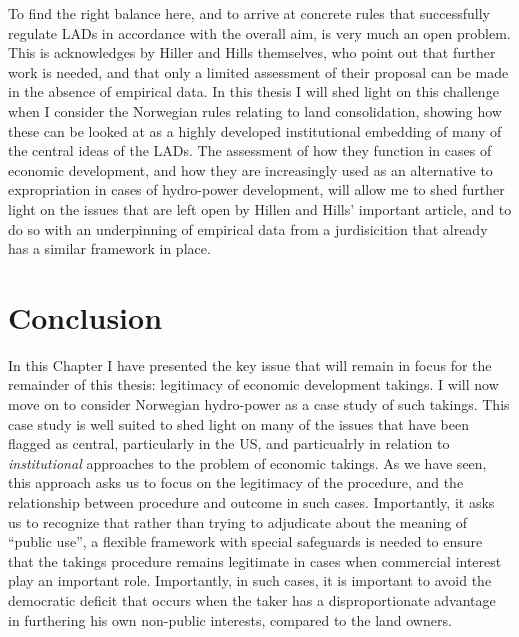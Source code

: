 To find the right balance here, and to arrive at concrete rules that successfully regulate LADs in accordance with the overall aim, is very much an open problem. This is acknowledges by Hiller and Hills themselves, who point out that further work is needed, and that only a limited assessment of their proposal can be made in the absence of empirical data. In this thesis I will shed light on this challenge when I consider the Norwegian rules relating to land consolidation, showing how these can be looked at as a highly developed institutional embedding of many of the central ideas of the LADs. The assessment of how they function in cases of economic development, and how they are increasingly used as an alternative to expropriation in cases of hydro-power development, will allow me to shed further light on the issues that are left open by Hillen and Hills' important article, and to do so with an underpinning of empirical data from a jurdisicition that already has a similar framework in place.

\section{Conclusion}

In this Chapter I have presented the key issue that will remain in focus for the remainder of this thesis: legitimacy of economic development takings. I will now move on to consider Norwegian hydro-power as a case study of such takings. This case study is well suited to shed light on many of the issues that have been flagged as central, particularly in the US, and particualrly in relation to {\it institutional} approaches to the problem of economic takings. As we have seen, this approach asks us to focus on the legitimacy of the procedure, and the relationship between procedure and outcome in such cases. Importantly, it asks us to recognize that rather than trying to adjudicate about the meaning of ``public use'', a flexible framework with special safeguards is needed to ensure that the takings procedure remains legitimate in cases when commercial interest play an important role. Importantly, in such cases, it is important to avoid the democratic deficit that occurs when the taker has a disproportionate advantage in furthering his own non-public interests, compared to the land owners. 

